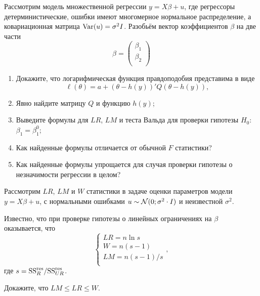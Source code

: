 \begin{problem}
  Рассмотрим модель множественной регрессии $y = X\beta + u$, где регрессоры детерминистические,
  ошибки имеют многомерное нормальное распределение,
  а ковариационная матрица $\operatorname{Var}(u)=\sigma^2 I$. Разобьём вектор коэффициентов $\beta$ на две части
  \[
    \beta = \begin{pmatrix}
      \beta_1 \\
      \beta_2 \\
    \end{pmatrix}
  \]

  \begin{enumerate}
    \item Докажите, что логарифмическая функция правдоподобия представима в виде
\[
     \ell(\theta) = a + (\theta - h(y))' Q (\theta - h(y)),
  \]
\item Явно найдите матрицу $Q$ и функцию $h(y)$;
\item Выведите формулы для $LR$, $LM$ и теста Вальда для проверки гипотезы $H_0$: $\beta_1 = \beta_1^0$;
\item Как найденные формулы отличается от обычной $F$ статистики?
\item Как найденные формулы упрощается для случая проверки гипотезы о незначимости регрессии в целом?
  \end{enumerate}

  \begin{sol}
  \end{sol}
\end{problem}


\begin{problem}
Рассмотрим $LR$, $LM$ и $W$ статистики в задаче оценки параметров модели $y=X\beta + u$, с нормальными ошибками $u\sim \mathcal{N}(0;\sigma^2 \cdot I)$ и неизвестной $\sigma^2$.

Известно, что при проверке гипотезы о линейных ограничениях на $\beta$ оказывается, что
\[
\begin{cases}
   LR = n \ln s \\
   W = n (s - 1) \\
   LM = n(s-1)/s \\
\end{cases},
\]
где $s = \mathrm{SS}^{\text{res}}_R / \mathrm{SS}^{\text{res}}_{UR}$.

Докажите, что $LM \leq LR \leq W$.
  \begin{sol}
  \end{sol}
\end{problem}


